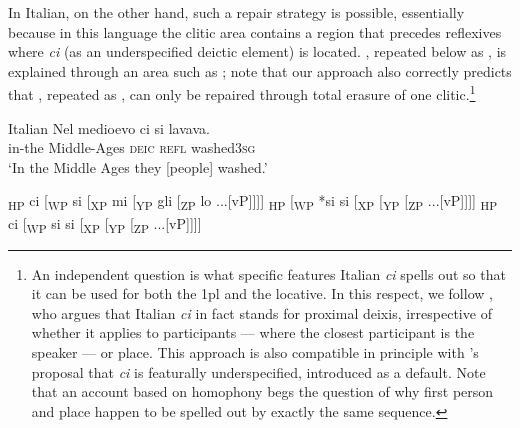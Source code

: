 \documentclass[output=paper,modfonts,nonflat,newtxmath,colorlinks,citecolor=brown]{langsci/langscibook}
\begin{document}
    \z

In Italian, on the other hand, such a repair strategy is possible, essentially because in this language the clitic area contains a region that precedes reflexives where \textit{ci} (as an underspecified deictic element) is located. , repeated below as , is explained through an area such as ; note that our approach also correctly predicts that , repeated as , can only be repaired through total erasure of one clitic.\footnote{An independent question is what specific features Italian \textit{ci} spells out so that it can be used for both the 1pl and the locative. In this respect, we follow \citet{Ferrazzano2003}, who argues that Italian \textit{ci} in fact stands for proximal deixis, irrespective of whether it applies to participants — where the closest participant is the speaker — or place. This approach is also compatible in principle with \citeauthor{Pescarini2007}’s proposal that \textit{ci} is featurally underspecified, introduced as a default. Note that an account based on homophony begs the question of why first person and place happen to be spelled out by exactly the same sequence.} 

\ea%
    \label{ex:cabre:26}
     Italian 
    \ex  \label{ex:cabre:26b}
    \gll Nel medioevo  ci  si  lavava. \\
    in-the Middle-Ages  \textsc{deic} \textsc{refl}  washed\textsc{3sg}  \\
    \glt  ‘In the Middle Ages they [people] washed.’
    \z
    \z
    

\ea%
    \label{ex:cabre:27}
    \ea {[}\textsubscript{HP}  ci   [\textsubscript{WP}   si  [\textsubscript{XP}  mi  [\textsubscript{YP}  gli  [\textsubscript{ZP} lo  ...[vP]{]]]}
    \ex {[}\textsubscript{HP}     [\textsubscript{WP} *si si  [\textsubscript{XP}    [\textsubscript{YP}    [\textsubscript{ZP}   ...[vP]{]]]}
    \ex  {[}\textsubscript{HP}  ci  [\textsubscript{WP}   si si  [\textsubscript{XP}     [\textsubscript{YP}    [\textsubscript{ZP}   ...[vP]{]]]}
    \z
    \z
\end{document}
